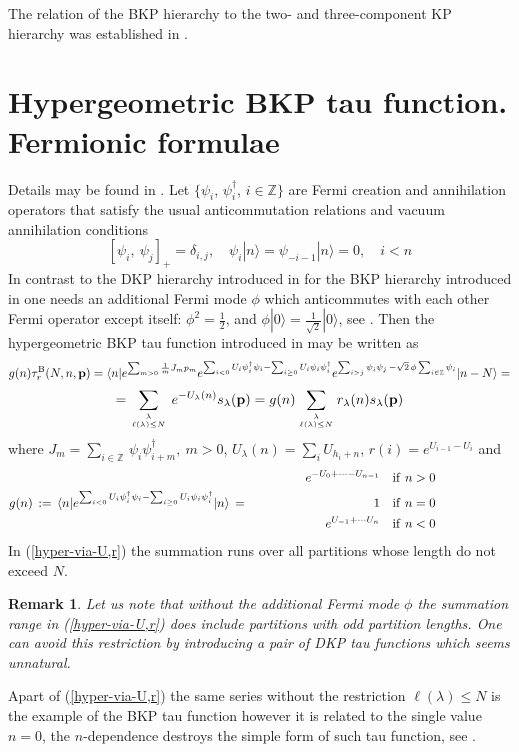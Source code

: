 \documentclass[a4paper,10pt]{article}
\newcommand{\bpow}{\mathbf{p}}
\theoremstyle{plain}
\newtheorem{Remark}{Remark}
\theoremstyle{remark}
\def\l{\langle}
\def\r{\rangle}
\def\be{\begin{equation}}
\def\ee{\end{equation}}
\def\br{\begin{Remark}\rm\small}
\def\er{\end{Remark}}
\def\bea{\begin{eqnarray}}
\def\eea{\end{eqnarray}}
\begin{document}
The relation of the BKP hierarchy to the two- and three-component KP hierarchy was established in \cite{LeurO-2014}.





\section{Hypergeometric BKP tau function. Fermionic formulae\label{fermionic-appendix}}
Details may be found in \cite{OS-2000, OST-I}.
Let
 $\{\psi_i$, $\psi_i^\dag$, $i \in \mathbb{Z}\}$ are Fermi creation and
annihilation operators that  satisfy the usual anticommutation relations and vacuum annihilation conditions
\[
[\psi_i, \ \psi_j]_+ = \delta_{i,j}, \quad \psi_i | n\rangle =
\psi_{-i-1} | n\rangle =0,\quad   i< n
 \]
In contrast to the DKP hierarchy introduced in \cite{JM} for the BKP hierarchy introduced in \cite{KvdLbispec}
one needs an additional Fermi mode  $\phi$ which anticommutes with each other
Fermi operator except itself: $\phi^2=\frac 12$, and
 $\phi|0\r=\frac{1}{\sqrt{2}}|0\r$, see \cite{KvdLbispec}. Then the hypergeometric BKP tau function introduced in
 \cite{OST-I} may be written as
 \[
 g(n)\tau^{\rm B}_r(N,n,\bpow) =
 \l n| e^{\sum_{m>0} \frac 1m J_m p_m}
 e^{\sum_{i < 0} U_i \psi_i^\dag \psi_i -\sum_{i \ge 0} U_i \psi_i\psi_i^\dag }
 e^{\sum_{i>j} \psi_i\psi_j\,-\sqrt{2}\,\phi \sum_{i\in\mathbb{Z}} \psi_i}|n-N\r =
 \]
 \be\label{hyper-via-U,r}
= \sum_{\lambda\atop \ell(\lambda)\le N} \,e^{-U_\lambda(n)} s_\lambda(\bpow)
 = g(n)
\sum_{\lambda\atop \ell(\lambda)\le N}  r_\lambda(n)s_\lambda(\bpow)
\ee
where  $J_m=\sum_{i\in\mathbb{Z}}\,\psi_i\psi^\dag_{i+m},\ m>0$,
$U_\lambda(n)=\sum_{i} U_{h_i+n}$,
$r(i)=e^{U_{i-1}-U_{i}}$
and
\bea
 e^{-U_0+\cdots -U_{n-1}}\quad {\rm if}\,\, n>0 \qquad\qquad\qquad \\
g(n)\,:=\,\l n|  e^{\sum_{i < 0} U_i \psi_i^\dag \psi_i -\sum_{i \ge 0} U_i \psi_i\psi_i^\dag }
|n\r\,= \qquad\qquad\qquad\qquad\qquad
1\quad {\rm if} \,\,n=0 \qquad\qquad\qquad
\label{g(n)}
\\
e^{U_{-1}+\cdots U_{n}}\quad {\rm if}\,\, n<0 \qquad\qquad\qquad
\eea
In (\ref{hyper-via-U,r}) the summation runs over all partitions whose length do not exceed $N$.
\br\label{DKPvsBKP}
Let us note that without the additional Fermi mode $\phi$ the summation range in (\ref{hyper-via-U,r}) does
include partitions with odd partition lengths. One can avoid this restriction by introducing a pair of DKP tau
functions which seems unnatural.
\er
Apart of (\ref{hyper-via-U,r}) the same series without the restriction $\ell(\lambda)\le N$ is the example
of the BKP tau function however it is related to the single value $n=0$, the $n$-dependence destroys the
simple form of such tau function, see \cite{OST-I}.
\end{document}

